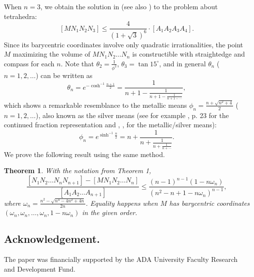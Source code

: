 \documentclass{article}
\newtheorem{theorem}{Theorem}
\begin{document}
When $n=3$, we obtain the solution in \cite{nguy0} (see also \cite{nguy2}) to the problem about tetrahedra:
$$[MN_1N_2N_3]\le
\frac{4}{\left(1+\sqrt{3}\right)^{6}}\cdot[A_1A_2A_{3}A_{4}].
$$
Since its barycentric coordinates involve only quadratic irrationalities, the point $M$ maximizing the volume of $MN_1N_2\ldots N_{n}$ is constructible with straightedge and compass for
each $n$. Note that $\theta_2=\frac{1}{\phi^2}$, $\theta_3=\tan{15^\circ}$, and in general $\theta_n$ ($n=1,2,\ldots$) can be written as
$$
\theta_n=e^{-\cosh^{-1}{\frac{n+1}{2}}}=\frac{1}{n+1-\frac{1}{n+1-\frac{1}{n+1-\cdots}}},
$$
which shows a remarkable resemblance to the metallic means $\phi_n=\frac{n+\sqrt{n^2+4}}{2}$ ($n=1,2,\ldots$), also known as the silver means (see for example \cite{wal}, p. 23 for the continued fraction representation and \cite{gil}, \cite{spi}, \cite{weis} for the metallic/silver means):
$$
\phi_n=e^{\sinh^{-1}{\frac{n}{2}}}=n+\frac{1}{n+\frac{1}{n+\frac{1}{n+\cdots}}}.
$$
We prove the following result using the same method.
\begin{theorem}
With the notation from Theorem 1,
$$\frac{[N_1N_2\ldots N_{n}N_{n+1}]-[MN_1N_2\ldots N_{n}]}{[A_1A_2\ldots A_{n+1}]}
\le\frac{\left(n-1\right)^{n-1}\left(1-n\omega_n\right)}{\left(n^{2}-n+1-n\omega_n\right)^{n-1}},$$
where $\omega_n=\frac{n^{2}-\sqrt{n^{4}-4 n^{2}+4 n}}{2 n}$. Equality
happens when $M$ has barycentric coordinates $(\omega_n,\omega_n,\ldots,\omega_n,1-n\omega_n)$ in the given order.
\end{theorem}

\subsection*{Acknowledgement.} The paper was financially supported by the ADA University Faculty Research and Development Fund.
\end{document}
